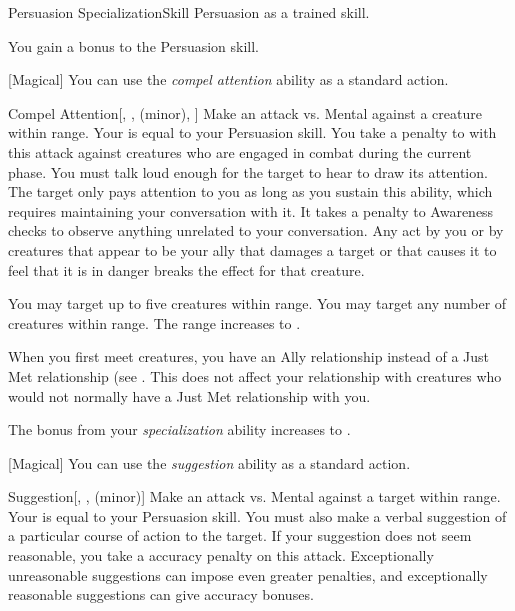     \begin{feat}{Persuasion Specialization}{Skill}
        \featpre Persuasion as a trained skill.

         You gain a  bonus to the Persuasion skill.

        [Magical] You can use the \textit{compel attention} ability as a standard action.
        \begin{freeability}{Compel Attention}[, ,  (minor), ]
            Make an attack vs. Mental against a creature within \rngmed range.
            Your  is equal to your Persuasion skill.
            You take a  penalty to  with this attack against creatures who are engaged in combat during the current phase.
            You must talk loud enough for the target to hear to draw its attention.
            \hit The target only pays attention to you as long as you sustain this ability, which requires maintaining your conversation with it.
            It takes a  penalty to Awareness checks to observe anything unrelated to your conversation.
            Any act by you or by creatures that appear to be your ally that damages a target or that causes it to feel that it is in danger breaks the effect for that creature.

            \rankline
             You may target up to five creatures within range.
             You may target any number of creatures within range.
             The range increases to \distrange.
        \end{freeability}

         When you first meet creatures, you have an Ally relationship instead of a Just Met relationship (see .
        This does not affect your relationship with creatures who would not normally have a Just Met relationship with you.

         The bonus from your \textit{specialization} ability increases to .

        [Magical] You can use the \textit{suggestion} ability as a standard action.
        \begin{freeability}{Suggestion}[, ,  (minor)]
            Make an attack vs. Mental against a target within \rngmed range.
            Your  is equal to your Persuasion skill.
            You must also make a verbal suggestion of a particular course of action to the target.
            If your suggestion does not seem reasonable, you take a  accuracy penalty on this attack.
            Exceptionally unreasonable suggestions can impose even greater penalties, and exceptionally reasonable suggestions can give accuracy bonuses.


\end{freeability}
\end{feat}
